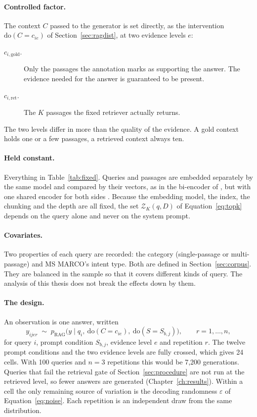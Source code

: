 \documentclass[12pt,a4paper,oneside]{scrreprt}
\begin{document}
\paragraph{Controlled factor.}  The context $C$ passed to the generator is set directly, as the intervention $\mathrm{do}(C = c_{ie})$ of Section~\ref{sec:ragdist}, at two evidence levels $e$:
\begin{description}
    \item[$c_{i,\text{gold}}$.] Only the passages the annotation marks as supporting the answer. The evidence needed for the answer is guaranteed to be present.
    \item[$c_{i,\text{ret}}$.] The $K$ passages the fixed retriever actually returns. 
\end{description}
The two levels differ in more than the quality of the evidence. A gold context holds one or a few passages, a retrieved context always ten.


\paragraph{Held constant.} Everything in Table~\ref{tab:fixed}. Queries and passages are embedded separately by the same model and compared by their vectors, as in the bi-encoder of \citet{karpukhin2020dpr}, but with one shared encoder for both sides \citep{reimers2019sbert}. Because the embedding model, the index, the chunking and the depth are all fixed, the set $\mathcal{Z}_K(q,D)$ of Equation~\eqref{eq:topk} depends on the query alone and never on the system prompt. 
\paragraph{Covariates.} Two properties of each query are recorded: the category (single-passage or multi-passage) and MS MARCO's intent type. Both are defined in Section~\ref{sec:corpus}. They are balanced in the sample so that it covers different kinds of query. The analysis of this thesis does not break the effects down by them.

\paragraph{The design.} An observation is one answer, written
\begin{equation}
\label{eq:design}
y_{ijer} \;\sim\; p_{\mathrm{RAG}}\bigl(y \;\big|\; q_i,\ \mathrm{do}(C = c_{ie}),\ \mathrm{do}(S = S_{b,j})\bigr), \qquad r = 1,\ldots,n,
\end{equation}
for query $i$, prompt condition $S_{b,j}$, evidence level $e$ and repetition $r$. The twelve prompt conditions and the two evidence levels are fully crossed, which gives 24 cells. With 100 queries and $n = 3$ repetitions this would be 7,200 generations. Queries that fail the retrieval gate of Section~\ref{sec:procedure} are not run at the retrieved level, so fewer answers are generated (Chapter~\ref{ch:results}). Within a cell the only remaining source of variation is the decoding randomness $\varepsilon$ of Equation~\eqref{eq:noise}. Each repetition is an independent draw from the same distribution.
\end{document}
